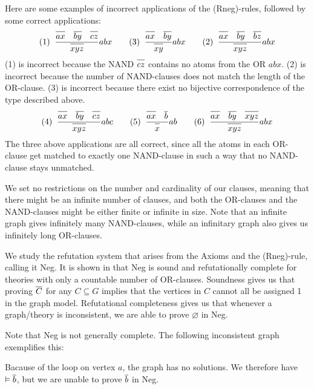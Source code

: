 Here are some examples of incorrect applications of the (Rneg)-rules, followed by some correct applications:
\begin{align}
  (1)\;\;\frac{\ol{ax}\quad\ol{by}\quad\ol{cz}}{\ol{xyz}}abx\quad\quad
  (3)\;\;\frac{\ol{ax}\quad\ol{by}}{\ol{xy}}abx\quad\quad
  (2)\;\;\frac{\ol{ax}\quad\ol{by}\quad\ol{bz}}{\ol{xyz}}abx
\end{align}
(1) is incorrect because the NAND $\ol{cz}$ contains no atoms from the OR $abx$.
(2) is incorrect because the number of NAND-clauses does not match the length of the OR-clause.
(3) is incorrect because there exist no bijective correspondence of the type described above.
\begin{align}
  (4)\;\;\frac{\ol{ax}\quad\ol{by}\quad\ol{cz}}{\ol{xyz}}abc\quad\quad
  (5)\;\;\frac{\ol{ax}\quad\ol{b}}{\ol{x}}ab\quad\quad
  (6)\;\;\frac{\ol{ax}\quad\ol{by}\quad\ol{xyz}}{\ol{xyz}}abx
\end{align}
The three above applications are all correct, since all the atoms in each OR-clause get matched to exactly one NAND-clause in such a way that no NAND-clause stays unmatched.

We set no restrictions on the number and cardinality of our clauses, meaning that there might be an infinite number of clauses, and both the OR-clauses and the NAND-clauses might be either finite or infinite in size.
Note that an infinite graph gives infinitely many NAND-clauses, while an infinitary graph also gives us infinitely long OR-clauses.

We study the refutation system that arises from the Axioms and the (Rneg)-rule, calling it Neg.
It is shown in \cite{michal-completeness} that Neg is sound and refutationally complete for theories with only a countable number of OR-clauses.
Soundness gives us that proving $\ol{C}$ for any $C \subseteq G$ implies that the vertices in $C$ cannot all be assigned 1 in the graph model.
Refutational completeness gives us that whenever a graph/theory is inconsistent, we are able to prove $\varnothing$ in Neg.

Note that Neg is not generally complete.
The following inconsistent graph exemplifies this:\par
\begin{figure}[!h]
  \centering
  \caption{}
  \label{fig:neg_not_complete}
\end{figure}
Bacause of the loop on vertex $a$, the graph has no solutions.
We therefore have $\vDash \ol{b}$, but we are unable to prove $\ol{b}$ in Neg.
